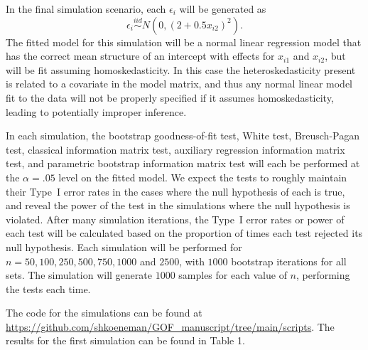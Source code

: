 \documentclass[sn-mathphys-ay]{sn-jnl}
\begin{document}
In the final simulation scenario, each $\epsilon_i$ will be generated as
\[\epsilon_i \stackrel{iid}{\sim} N \left( 0,(2 + 0.5 x_{i2})^2 \right).\] The fitted model for this simulation will be a normal linear regression model that has the correct mean structure of an intercept with effects for $x_{i1}$ and $x_{i2}$,
but will be fit assuming homoskedasticity. In this case the heteroskedasticity present is related to a covariate in the model matrix, and thus any normal linear model fit to the data will not be properly
specified if it assumes homoskedasticity, leading to potentially improper inference.

In each simulation, the bootstrap goodness-of-fit test, White test, Breusch-Pagan test, classical information matrix test, auxiliary regression information matrix test, and parametric bootstrap information matrix test will each be performed at the $\alpha = .05$ level on the  fitted model. We expect the tests to roughly maintain their
Type~I error rates in the cases where the null hypothesis of each is true, and reveal the power of the test in the simulations where the null hypothesis is violated. After many simulation iterations, the
Type~I error rates or power of each test will be calculated based on the proportion of times each test rejected its null hypothesis. Each simulation will be performed for $n = 50, 100, 250, 500, 750, 1000$ and $2500$, with $1000$
bootstrap iterations for all sets. The simulation will generate $1000$ samples for each value of $n$, performing the tests each time.

The code for the simulations can be found at \url{https://github.com/shkoeneman/GOF_manuscript/tree/main/scripts}. The results for the first simulation
can be found in Table 1.

%	
\end{document}
